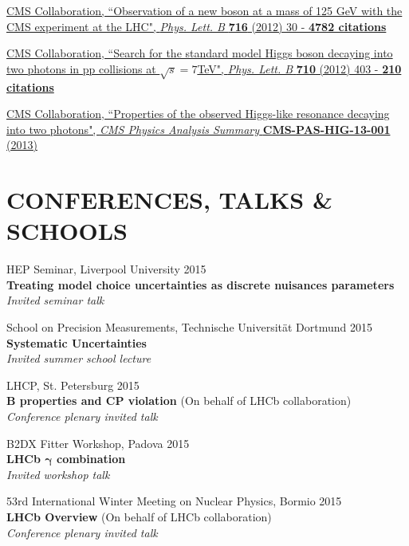 \documentclass[margin, 10pt]{res} %
\begin{document}
\begin{resume}
\href{http://inspirehep.net/record/1124338}
{
CMS Collaboration, ``Observation of a new boson at a mass of 125 GeV with the CMS experiment at the LHC",
\textit{Phys. Lett. B}
\textbf{716} (2012) 30 - \textbf{4782 citations}
}

\href{http://inspirehep.net/record/1088230}
{
CMS Collaboration, ``Search for the standard model Higgs boson decaying into two photons in pp collisions at $\sqrt{s}=7$TeV",
\textit{Phys. Lett. B}
\textbf{710} (2012) 403 - \textbf{210 citations}
}

\href{http://inspirehep.net/record/1260840}
{
CMS Collaboration, ``Properties of the observed Higgs-like resonance decaying into two photons",
\textit{CMS Physics Analysis Summary}
\textbf{CMS-PAS-HIG-13-001} (2013)%
}


\section{CONFERENCES, TALKS \& SCHOOLS}

HEP Seminar, Liverpool University 2015 \\
\textbf{Treating model choice uncertainties as discrete nuisances parameters} \\
\textit{Invited seminar talk}

School on Precision Measurements, Technische Universit\"{a}t Dortmund 2015 \\
\textbf{Systematic Uncertainties} \\
\textit{Invited summer school lecture}


LHCP, St. Petersburg 2015 \\
\textbf{B properties and CP violation} (On behalf of LHCb collaboration) \\
\textit{Conference plenary invited talk}

B2DX Fitter Workshop, Padova 2015 \\
\textbf{LHCb $\mathbf{\gamma}$ combination}\\
\textit{Invited workshop talk}

53rd International Winter Meeting on Nuclear Physics, Bormio 2015 \\
\textbf{LHCb Overview} (On behalf of LHCb collaboration) \\
\textit{Conference plenary invited talk}


\end{resume}
\end{document}
